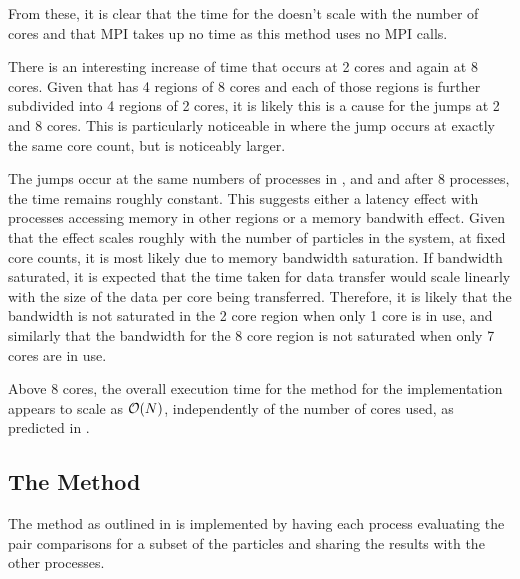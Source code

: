 %
From these, it is clear that
the time for the \individualoperation{} doesn't scale with the number
of cores and that MPI takes up no time as this method uses no MPI calls.

There is an interesting increase of time that occurs at 2 cores and again
at 8 cores.
%
Given that \hector{} has 4 \numa{} regions of 8 cores and each of those
regions is further subdivided into 4 \numa{} regions of 2 cores,
it is likely this is a cause for the jumps at 2 and 8 cores.
%
This is particularly noticeable in
where the jump occurs at exactly the same core count, but is noticeably larger.

The jumps occur at the same numbers of processes in
,
 and
and after 8 processes, the time remains roughly constant.
%
This suggests either a latency effect with processes accessing memory
in other \numa{} regions or a memory bandwith effect.
%
Given that the effect scales roughly with the number of particles
in the system, at fixed core counts, it is most likely due to
memory bandwidth saturation.
%
If bandwidth saturated, it is expected that the time taken for
data transfer would
scale linearly with the size of the data per core being transferred.
%
Therefore, it is likely that the bandwidth is not saturated in
the 2 core \numa{} region
when only 1 core is in use, and
similarly that the bandwidth for
the 8 core \numa{} region is not saturated
when only 7 cores are in use.

Above 8 cores, the overall execution time for
the \individualoperation{} method for the \replicateddata{} implementation
appears to scale as $\mathcal{O}{\left({ N }\right)}$, independently of the number of cores used,
as predicted in
.


%
%

\subsection{The \pairoperation{} Method}

The \pairoperation{} method as outlined in
is implemented by having each process evaluating the pair
comparisons for a subset of the particles and sharing the
results with the other processes.

